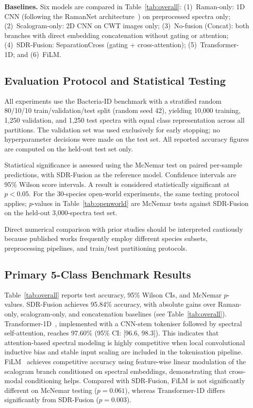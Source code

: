 \documentclass[preprint,12pt]{elsarticle}
\begin{document}
\textbf{Baselines.} Six models are compared in Table~\ref{tab:overall}:
(1)~Raman-only: 1D CNN (following the RamanNet architecture~\cite{zhou2022ramannet})
on preprocessed spectra only; (2)~Scalogram-only: 2D CNN on CWT images
only; (3)~No-fusion (Concat): both branches with direct embedding
concatenation without gating or attention; (4)~SDR-Fusion:
SeparationCross (gating + cross-attention); (5)~Transformer-1D;
and (6)~FiLM.

\subsection{Evaluation Protocol and Statistical Testing}
\label{ssec:eval_protocol}

All experiments use the Bacteria-ID benchmark with a stratified random
80/10/10 train/validation/test split (random seed 42), yielding 10,000
training, 1,250 validation, and 1,250 test spectra with equal class
representation across all partitions. The validation set was used
exclusively for early stopping; no hyperparameter decisions were made
on the test set. All reported accuracy figures are computed on the
held-out test set only.

Statistical significance is assessed using the McNemar test on paired
per-sample predictions, with SDR-Fusion as the reference model.
Confidence intervals are 95\% Wilson score intervals. A result is
considered statistically significant at $p < 0.05$. For the
30-species open-world experiments, the same testing protocol applies;
$p$-values in Table~\ref{tab:openworld} are McNemar tests against
SDR-Fusion on the held-out 3,000-spectra test set.

Direct numerical comparison with prior studies should be interpreted
cautiously because published works frequently employ different species
subsets, preprocessing pipelines, and train/test partitioning
protocols.

\subsection{Primary 5-Class Benchmark Results}
\label{ssec:performance}

Table~\ref{tab:overall} reports test accuracy, 95\% Wilson CIs, and
McNemar $p$-values. SDR-Fusion achieves 95.84\% accuracy, with absolute
gains over Raman-only, scalogram-only, and concatenation baselines
(see Table~\ref{tab:overall}).
Transformer-1D~\cite{vaswani2017attention}, implemented with a
CNN-stem tokeniser followed by spectral self-attention, reaches
97.60\% (95\% CI: [96.6, 98.3]). This indicates that attention-based
spectral modeling is highly competitive when local convolutional
inductive bias and stable input scaling are included in the tokenisation
pipeline.
FiLM~\cite{perez2018film} achieves competitive accuracy using
feature-wise linear modulation of the scalogram branch conditioned on
spectral embeddings, demonstrating that cross-modal conditioning helps.
Compared with SDR-Fusion, FiLM is not significantly different on McNemar
testing ($p=0.061$), whereas Transformer-1D differs significantly from
SDR-Fusion ($p=0.003$).
\end{document}
